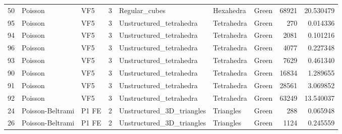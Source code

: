 \begin{tabular}{lllrlllrr}
50  &           Poisson &                            VF5 &               3 &                   Regular\_cubes &              Hexahedra  &                                Green &                    68921 &                        20.530479 \\
95  &           Poisson &                            VF5 &               3 &         Unstructured\_tetrahedra &             Tetrahedra  &                                Green &                      270 &                         0.014336 \\
94  &           Poisson &                            VF5 &               3 &         Unstructured\_tetrahedra &             Tetrahedra  &                                Green &                     2081 &                         0.101216 \\
96  &           Poisson &                            VF5 &               3 &         Unstructured\_tetrahedra &             Tetrahedra  &                                Green &                     4077 &                         0.227348 \\
93  &           Poisson &                            VF5 &               3 &         Unstructured\_tetrahedra &             Tetrahedra  &                                Green &                     7629 &                         0.461340 \\
90  &           Poisson &                            VF5 &               3 &         Unstructured\_tetrahedra &             Tetrahedra  &                                Green &                    16834 &                         1.289655 \\
91  &           Poisson &                            VF5 &               3 &         Unstructured\_tetrahedra &             Tetrahedra  &                                Green &                    28561 &                         3.069852 \\
92  &           Poisson &                            VF5 &               3 &         Unstructured\_tetrahedra &             Tetrahedra  &                                Green &                    63249 &                        13.540037 \\
24  &  Poisson-Beltrami &                          P1 FE &               2 &       Unstructured\_3D\_triangles &              Triangles  &                                Green &                      288 &                         0.065948 \\
26  &  Poisson-Beltrami &                          P1 FE &               2 &       Unstructured\_3D\_triangles &              Triangles  &                                Green &                     1124 &                         0.245559 \\

\end{tabular}
